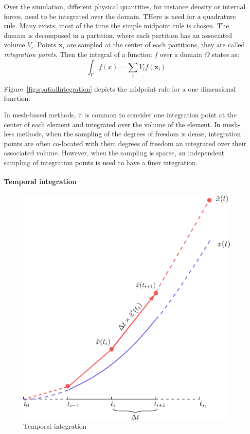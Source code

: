 Over the simulation, different physical quantities, for instance density or internal forces, need to be integrated over the domain. THere is need for a quadrature rule. Many exists, most of the time the simple midpoint rule is chosen. The domain is decomposed in a partition, where each partition has an associated volume $V_{i}$. Points $\mathbf{x}_{i}$ are sampled at the center of each partitions, they are called \emph{integration points}. Then the integral of a function $f$ over a domain $\Omega$ states as:
\begin{equation}
\label{eq:midpointRule}
\int_{V} f(x) = \sum_{i} V_{i}f(\mathbf{x}_{i})
\end{equation}

Figure~\ref{fig:spatialIntegration} depicts the midpoint rule for a one dimensional function.

In mesh-based methods, it is common to consider one integration point at the center of each element and integrated over the volume of the element.
In mesh-less methods, when the sampling of the degrees of freedom is dense, integration points are often co-located with them degrees of freedom an integrated over their associated volume. However, when the sampling is sparse, an independent sampling of integration points is used to have a finer integration.

\paragraph{Temporal integration}

\begin{figure}[!ht]
\centering
\includegraphics[scale=0.6]{images/continuum_mechanics/timeIntegration.png}
\caption[STAR mechanics: Temporal integration]{\label{fig:timeIntegration} Temporal integration}
\end{figure}

